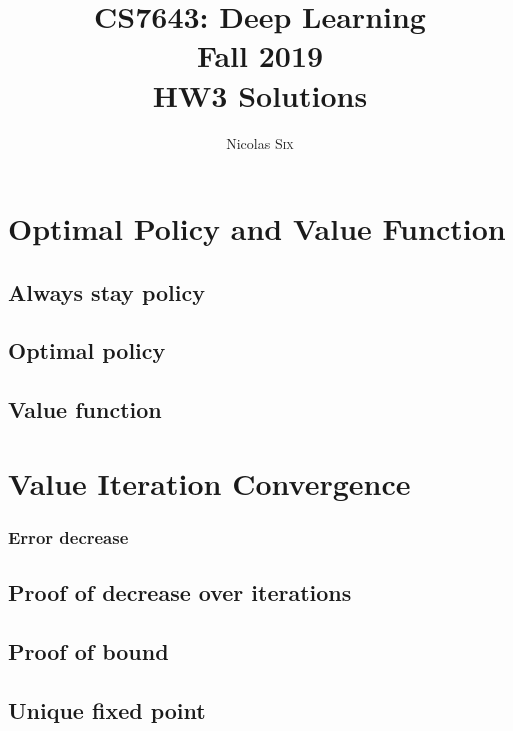 \documentclass[11pt,english]{article}
\begin{document}
    \title{CS7643: Deep Learning \\
    Fall 2019\\ HW3 Solutions}
    \author{Nicolas \textsc{Six}}
    \maketitle



    \section{Optimal Policy and Value Function}
    \subsection{Always stay policy}
    

    \pagebreak
    \subsection{Optimal policy}
    

    \pagebreak
    \subsection{Value function}
    

    \pagebreak
    \section{Value Iteration Convergence}
    \subsubsection{Error decrease}

    

    \pagebreak
    \subsection{Proof of decrease over iterations}
    

    \pagebreak
    \subsection{Proof of bound}
    

    \pagebreak
    \subsection{Unique fixed point}
    
\end{document}
